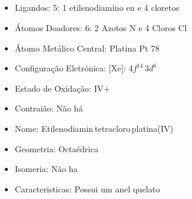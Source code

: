 \documentclass[12pt]{article}
\begin{document}
	\subsection{\ch{[Pt(en)Cl4]}}
	\begin{itemize}
   
   
   \item Ligandos: 5:
   	1 etilenodiamino en e 
		4 cloretos 
   
   
   \item Átomos Doadores: 6:
   	2 Azotos N e
		4 Cloros Cl
   
   \item Átomo Metálico Central: Platina Pt 78
   
   \item Configuração Eletrónica: 
   	[Xe]: $ 4f^{14}\,3d^6 $
   
   \item Estado de Oxidação: IV+
   
   \item Contraião: Não há
   
   \item Nome: Etilenodiamin\,tetracloro\,platina(IV)
   
   \item Geometria: Octaédrica
   
   \item Isomeria: Não ha

	\item Caracteristicas: Possui um anel quelato

	\end{itemize}
	
\break

\end{document}
